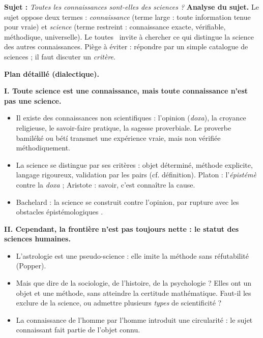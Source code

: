 \documentclass[11pt]{article}
\begin{document}
\begin{exoresolu}
\textbf{Sujet :} \emph{Toutes les connaissances sont-elles des sciences ?}
\tcblower
\textbf{Analyse du sujet.} Le sujet oppose deux termes : \emph{connaissance} (terme large : toute information tenue pour vraie) et \emph{science} (terme restreint : connaissance exacte, vérifiable, méthodique, universelle). Le \guillemotleft toutes \guillemotright\ invite à chercher ce qui distingue la science des autres connaissances. Piège à éviter : répondre par un simple catalogue de sciences ; il faut discuter un \emph{critère}.

\textbf{Plan détaillé (dialectique).}

\textbf{I. Toute science est une connaissance, mais toute connaissance n'est pas une science.}
\begin{itemize}
\item Il existe des connaissances non scientifiques : l'opinion (\emph{doxa}), la croyance religieuse, le savoir-faire pratique, la sagesse proverbiale. Le proverbe bamiléké ou bétí transmet une expérience vraie, mais non vérifiée méthodiquement.
\item La science se distingue par ses critères : objet déterminé, méthode explicite, langage rigoureux, validation par les pairs (cf. définition). Platon : l'\emph{épistémè} contre la \emph{doxa} ; Aristote : savoir, c'est connaître la cause.
\item Bachelard : la science se construit contre l'opinion, par rupture avec les \guillemotleft obstacles épistémologiques \guillemotright.
\end{itemize}

\textbf{II. Cependant, la frontière n'est pas toujours nette : le statut des sciences humaines.}
\begin{itemize}
\item L'astrologie est une pseudo-science : elle imite la méthode sans réfutabilité (Popper).
\item Mais que dire de la sociologie, de l'histoire, de la psychologie ? Elles ont un objet et une méthode, sans atteindre la certitude mathématique. Faut-il les exclure de la science, ou admettre plusieurs \emph{types} de scientificité ?
\item La connaissance de l'homme par l'homme introduit une circularité : le sujet connaissant fait partie de l'objet connu.
\end{itemize}


\end{exoresolu}
\end{document}
